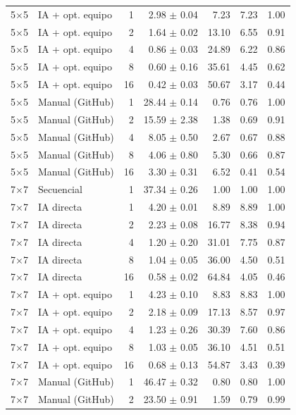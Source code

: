 \begin{tabular}{llrrrrr}
5$\times$5 & IA + opt. equipo & 1 & 2.98 $\pm$ 0.04 & 7.23 & 7.23 & 1.00 \\
5$\times$5 & IA + opt. equipo & 2 & 1.64 $\pm$ 0.02 & 13.10 & 6.55 & 0.91 \\
5$\times$5 & IA + opt. equipo & 4 & 0.86 $\pm$ 0.03 & 24.89 & 6.22 & 0.86 \\
5$\times$5 & IA + opt. equipo & 8 & 0.60 $\pm$ 0.16 & 35.61 & 4.45 & 0.62 \\
5$\times$5 & IA + opt. equipo & 16 & 0.42 $\pm$ 0.03 & 50.67 & 3.17 & 0.44 \\
5$\times$5 & Manual (GitHub) & 1 & 28.44 $\pm$ 0.14 & 0.76 & 0.76 & 1.00 \\
5$\times$5 & Manual (GitHub) & 2 & 15.59 $\pm$ 2.38 & 1.38 & 0.69 & 0.91 \\
5$\times$5 & Manual (GitHub) & 4 & 8.05 $\pm$ 0.50 & 2.67 & 0.67 & 0.88 \\
5$\times$5 & Manual (GitHub) & 8 & 4.06 $\pm$ 0.80 & 5.30 & 0.66 & 0.87 \\
5$\times$5 & Manual (GitHub) & 16 & 3.30 $\pm$ 0.31 & 6.52 & 0.41 & 0.54 \\
\midrule
7$\times$7 & Secuencial & 1 & 37.34 $\pm$ 0.26 & 1.00 & 1.00 & 1.00 \\
7$\times$7 & IA directa & 1 & 4.20 $\pm$ 0.01 & 8.89 & 8.89 & 1.00 \\
7$\times$7 & IA directa & 2 & 2.23 $\pm$ 0.08 & 16.77 & 8.38 & 0.94 \\
7$\times$7 & IA directa & 4 & 1.20 $\pm$ 0.20 & 31.01 & 7.75 & 0.87 \\
7$\times$7 & IA directa & 8 & 1.04 $\pm$ 0.05 & 36.00 & 4.50 & 0.51 \\
7$\times$7 & IA directa & 16 & 0.58 $\pm$ 0.02 & 64.84 & 4.05 & 0.46 \\
7$\times$7 & IA + opt. equipo & 1 & 4.23 $\pm$ 0.10 & 8.83 & 8.83 & 1.00 \\
7$\times$7 & IA + opt. equipo & 2 & 2.18 $\pm$ 0.09 & 17.13 & 8.57 & 0.97 \\
7$\times$7 & IA + opt. equipo & 4 & 1.23 $\pm$ 0.26 & 30.39 & 7.60 & 0.86 \\
7$\times$7 & IA + opt. equipo & 8 & 1.03 $\pm$ 0.05 & 36.10 & 4.51 & 0.51 \\
7$\times$7 & IA + opt. equipo & 16 & 0.68 $\pm$ 0.13 & 54.87 & 3.43 & 0.39 \\
7$\times$7 & Manual (GitHub) & 1 & 46.47 $\pm$ 0.32 & 0.80 & 0.80 & 1.00 \\
7$\times$7 & Manual (GitHub) & 2 & 23.50 $\pm$ 0.91 & 1.59 & 0.79 & 0.99 \\

\end{tabular}
